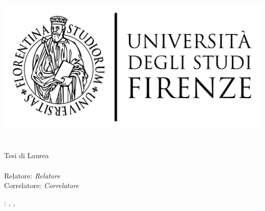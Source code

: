 \begin{titlepage}
	\begin{center}
   	\large
      \hfill
      \vfill
      \begingroup
         \includegraphics[scale=0.15]{logo/LOGO}\\
			\myFaculty \\
			\myDegree \\
			\vspace{0.5cm}
         \vspace{0.5cm}
         Tesi di Laurea
      \endgroup
      \vfill
      \begingroup
      	\color{Maroon}\spacedallcaps{\myItalianTitle} \\ $\ $\\
	\bigskip
      \endgroup
      \spacedlowsmallcaps{\myName}
      \vfill
      \vfill
      Relatore: \emph{Relatore}\\
      Correlatore: \emph{Correlatore}\\
      \vfill
      \vfill
      \myTime
      \vfill
	\end{center}
\end{titlepage}
   \newpage
	\thispagestyle{empty}
	\hfill
	\vfill
	\noindent\myName:
	\textit{\myItalianTitle,}
	\myDegree, \textcopyright\ \myTime

